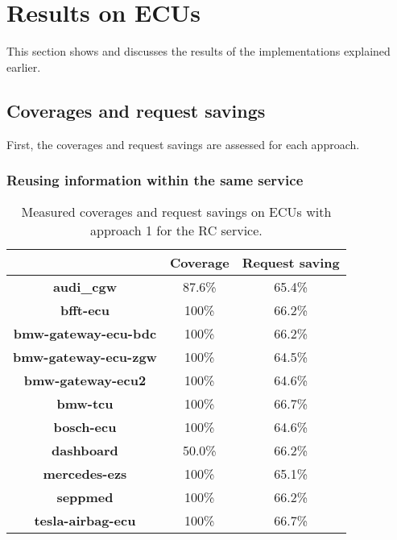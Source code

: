 \chapter{Results on ECUs}

This section shows and discusses the results of the implementations explained earlier.

\section{Coverages and request savings}

First, the coverages and request savings are assessed for each approach.

\subsection{Reusing information within the same service}

\begin{table}[H]
    \begin{center}
    \begin{tabular}{ccc}
        \hline
        & \textbf{Coverage} & \textbf{Request saving} \\
        \hline
        \textbf{audi\_cgw} & 87.6\% & 65.4\% \\
        \textbf{bfft-ecu} & 100\% & 66.2\% \\
        \textbf{bmw-gateway-ecu-bdc} & 100\% & 66.2\% \\
        \textbf{bmw-gateway-ecu-zgw} & 100\% & 64.5\% \\
        \textbf{bmw-gateway-ecu2} & 100\% & 64.6\% \\
        \textbf{bmw-tcu} & 100\% & 66.7\% \\
        \textbf{bosch-ecu} & 100\% & 64.6\% \\
        \textbf{dashboard} & 50.0\% & 66.2\% \\
        \textbf{mercedes-ezs} & 100\% & 65.1\% \\
        \textbf{seppmed} & 100\% & 66.2\% \\
        \textbf{tesla-airbag-ecu} & 100\% & 66.7\% \\
        \hline

    \end{tabular}
    \end{center}
    \caption{Measured coverages and request savings on ECUs with approach 1 for the RC service.}
    \label{tab:evaluation-approach1}
\end{table}

